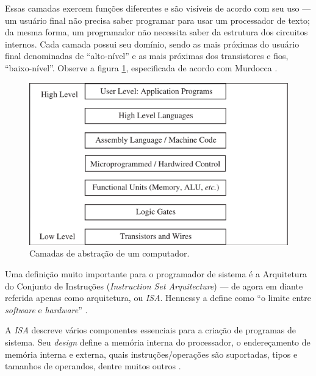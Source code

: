 Essas camadas exercem funções diferentes e são visíveis de acordo com seu uso
--- um usuário final não precisa saber programar para usar um processador de
texto; da mesma forma, um programador não necessita saber da estrutura dos
circuitos internos. Cada camada possui seu domínio, sendo as mais próximas do
usuário final denominadas de ``alto-nível'' e as mais próximas dos transistores
e fios, ``baixo-nível''. Observe a figura \ref{camadas}, especificada de acordo
com Murdocca \cite{principles}.

\begin{figure}[ptb]
  \begin{center}
    \includegraphics[scale=.6]{imagens/1_camadas}
  \end{center}
  \caption{Camadas de abstração de um computador.}
  \label{camadas}
\end{figure}


Uma definição muito importante para o programador de sistema é a Arquitetura do
Conjunto de Instruções (\textit{Instruction Set Arquitecture}) --- de agora em
diante referida apenas como arquitetura, ou \textit{ISA}. Hennessy a define como
``o limite entre \textit{software} e \textit{hardware}'' \cite{hennessy}.

A \textit{ISA} descreve vários componentes essenciais para a criação de
programas de sistema. Seu \textit{design} define a memória interna do
processador, o endereçamento de memória interna e externa, quais
instruções/operações são suportadas, tipos e tamanhos de operandos, dentre
muitos outros  \cite{patterson}.

